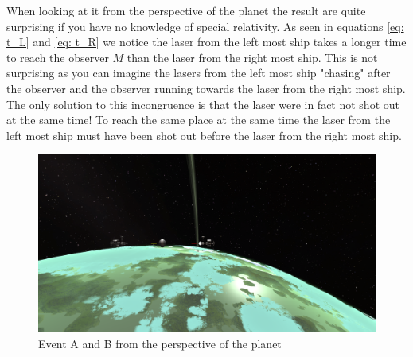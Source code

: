 \documentclass[reprint,english,notitlepage]{revtex4-2}
\begin{document}
  When looking at it from the perspective of the planet the result are quite surprising if you have no knowledge of special relativity. As seen in equations \ref{eq: t_L} and \ref{eq: t_R} we notice the laser from the left most ship takes a longer time to reach the observer $ M $ than the laser from the right most ship. This is not surprising as you can imagine the lasers from the left most ship "chasing" after the observer and the observer running towards the laser from the right most ship. The only solution to this incongruence is that the laser were in fact not shot out at the same time! To reach the same place at the same time the laser from the left most ship must have been shot out before the laser from the right most ship. 
  \begin{figure}[h!]
    \centering
    \includegraphics[scale = .1]{figures/B_Planet.png}
    \caption{Event A and B from the perspective of the planet}
    \label{fig: A_B_Planet}
  \end{figure}
  
\end{document}

